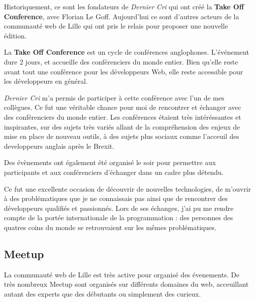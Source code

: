 \documentclass[12pt,a4paper]{article}
\begin{document}
  \bigskip

  Historiquement, ce sont les fondateurs de \emph{Dernier Cri} qui ont
  créé la \textbf{Take Off Conference}, avec Florian Le Goff. Aujourd'hui
  ce sont d'autres acteurs de la communauté web de Lille qui ont pris le
  relais pour proposer une nouvelle édition.

  \bigskip

  La \textbf{Take Off Conference} est un cycle de conférences anglophones.
  L'événement dure 2 jours, et accueille des conférenciers du monde
  entier. Bien qu'elle reste avant tout une conférence pour les
  développeurs Web, elle reste accessible pour les développeurs en
  général.

  \bigskip

  \emph{Dernier Cri} m'a permis de participer à cette conférence avec l'un
  de mes collègues. Ce fut une véritable chance pour moi de rencontrer et
  échanger avec des conférenciers du monde entier. Les conférences étaient
  très intéréssantes et inspirantes, sur des sujets très variés allant de
  la compréhension des enjeux de mise en place de nouveau outils, à des
  sujets plus sociaux comme l'acceuil des developpeurs anglais après le
  Brexit.

  \bigskip

  Des évènements ont également été organisé le soir pour permettre aux
  participants et aux conférenciers d'échanger dans un cadre plus détendu.

  \bigskip

  Ce fut une excellente occasion de découvrir de nouvelles technologies,
  de m'ouvrir à des problématiques que je ne connaissais pas ainsi que de
  rencontrer des développeurs qualifiés et passionnés. Lors de ses
  échanges, j'ai pu me rendre compte de la portée internationale de la
  programmation : des personnes des quatres coins du monde se retrouvaient
  sur les mêmes problématiques.

  \bigskip

  \subsection{Meetup}\label{meetup}

  \bigskip

  La communauté web de Lille est très active pour organisé des évenements.
  De très nombreux Meetup sont organisés sur différents domaines du web,
  acceuillant autant des experts que des débutants ou simplement des
  curieux.
\end{document}
